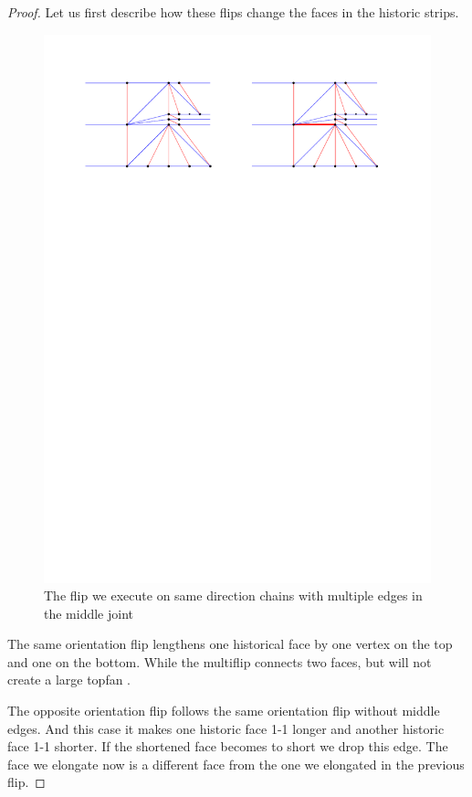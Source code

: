 \begin{proof}
    Let us first describe how these flips change the faces in the historic strips.
    \begin{figure}[h]
      \centering
      \includegraphics[width =\textwidth]{unifiedAlgo/img/post/sameMultiFlip}
      \caption{The flip we execute on same direction chains with multiple edges in the middle joint}
      \label{fig:uni:sameMultiFlip}
    \end{figure}
    The same orientation flip lengthens one historical face by one vertex on the top and one on the bottom. While the multiflip connects two faces, but will not create a large topfan .

    The opposite orientation flip follows the same orientation flip without middle edges. And this case it makes one historic face 1-1 longer and another historic face 1-1 shorter. If the shortened face becomes to short we drop this edge.
    The face we elongate now is a different face from the one we elongated in the previous flip.


\end{proof}
